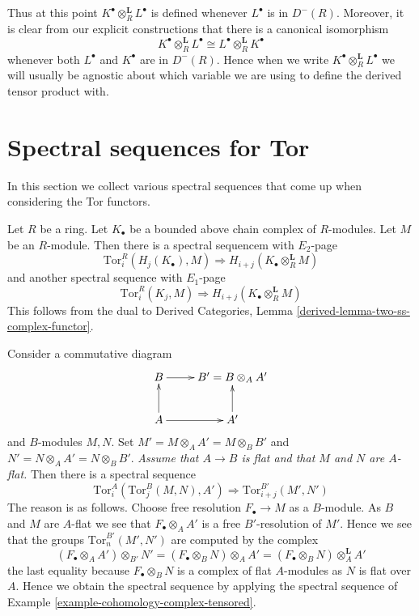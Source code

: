 \noindent
Thus at this point $K^\bullet \otimes_R^{\mathbf{L}} L^\bullet$
is defined whenever $L^\bullet$ is in $D^{-}(R)$.
Moreover, it is clear from our explicit constructions that
there is a canonical isomorphism
$$
K^\bullet \otimes_R^{\mathbf{L}} L^\bullet
\cong
L^\bullet \otimes_R^{\mathbf{L}} K^\bullet
$$
whenever both $L^\bullet$ and $K^\bullet$ are in $D^{-}(R)$.
Hence when we write $K^\bullet \otimes_R^{\mathbf{L}} L^\bullet$
we will usually be agnostic about which variable we are using to
define the derived tensor product with.







\section{Spectral sequences for Tor}
\label{section-spectral-sequence-tor}


\noindent
In this section we collect various spectral sequences that come up
when considering the Tor functors.

\begin{example}
\label{example-cohomology-complex-tensored}
Let $R$ be a ring. Let $K_\bullet$ be a bounded above chain complex
of $R$-modules. Let $M$ be an $R$-module. Then there is a
spectral sequencem with $E_2$-page
$$
\text{Tor}^R_i(H_j(K_\bullet), M)
\Rightarrow
H_{i + j}(K_\bullet \otimes^{\mathbf{L}}_R M)
$$
and another spectral sequence with $E_1$-page
$$
\text{Tor}^R_i(K_j, M)
\Rightarrow
H_{i + j}(K_\bullet \otimes^{\mathbf{L}}_R M)
$$
This follows from the dual to
Derived Categories, Lemma \ref{derived-lemma-two-ss-complex-functor}.
\end{example}

\begin{example}
\label{example-tor-base-change}
Consider a commutative diagram
$$
\xymatrix{
B \ar[r] & B' = B \otimes_A A' \\
A \ar[r] \ar[u] & A' \ar[u]
}
$$
and $B$-modules $M, N$. Set $M' = M \otimes_A A' = M \otimes_B B'$
and $N' = N \otimes_A A' = N \otimes_B B'$.
{\it Assume that $A \to B$ is flat and that $M$ and $N$ are $A$-flat.}
Then there is a spectral sequence
$$
\text{Tor}^A_i(\text{Tor}_j^B(M, N), A')
\Rightarrow
\text{Tor}^{B'}_{i + j}(M', N')
$$
The reason is as follows. Choose free resolution
$F_\bullet \to M$ as a $B$-module. As $B$ and $M$ are $A$-flat we see
that $F_\bullet \otimes_A A'$ is a free $B'$-resolution of $M'$.
Hence we see that the groups $\text{Tor}^{B'}_n(M', N')$ are
computed by the complex
$$
(F_\bullet \otimes_A A') \otimes_{B'} N' =
(F_\bullet \otimes_B N) \otimes_A A' =
(F_\bullet \otimes_B N) \otimes^{\mathbf{L}}_A A'
$$
the last equality because $F_\bullet \otimes_B N$ is a complex
of flat $A$-modules as $N$ is flat over $A$. Hence we obtain the
spectral sequence by applying the spectral sequence of
Example \ref{example-cohomology-complex-tensored}.
\end{example}





